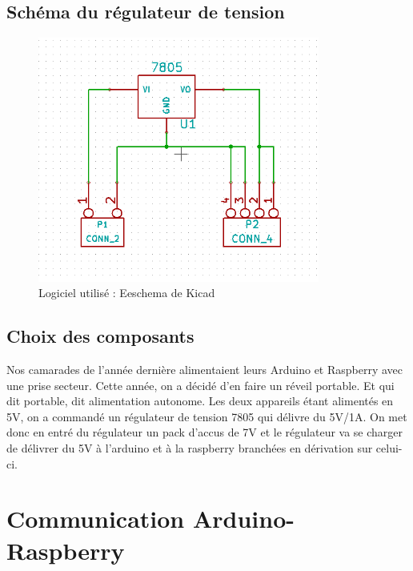 \subsection{Schéma du régulateur de tension}
\begin{figure}[h]
	\centering
	\includegraphics[width=350px]{images/SchemaDuRegulateur.png}
	\caption{Logiciel utilisé : Eeschema de Kicad}
\end{figure}

\subsection{Choix des composants} 
	Nos camarades de l'année dernière alimentaient leurs Arduino et Raspberry avec une prise secteur. Cette année, on a décidé d'en faire un réveil portable. Et qui dit portable, dit alimentation autonome. Les deux appareils étant alimentés en 5V, on a commandé un régulateur de tension 7805 qui délivre du 5V/1A. On met donc en entré du régulateur un pack d'accus de 7V et le régulateur va se charger de délivrer du 5V à l'arduino et à la raspberry branchées en dérivation sur celui-ci.

\section{Communication Arduino-Raspberry}
